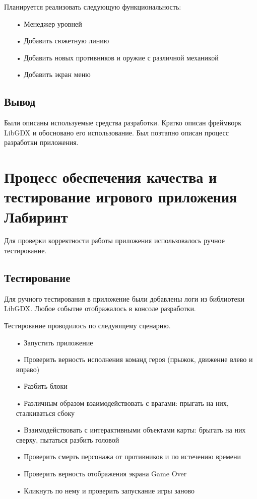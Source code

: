 Планируется реализовать следующую функциональность:
\begin{enumerate}
\item[•]  Менеджер уровней
\item[•]  Добавить сюжетную линию
\item[•]  Добавить новых противников и оружие с различной механикой
\item[•]  Добавить экран меню
\end{enumerate}

\subsection{Вывод}

Были описаны используемые средства разработки. Кратко описан фреймворк LibGDX и обосновано его использование. Был поэтапно описан процесс разработки приложения.

\section{Процесс обеспечения качества и тестирование игрового приложения Лабиринт}


Для проверки корректности работы приложения использовалось ручное тестирование.

\subsection{Тестирование}

Для ручного тестирования в приложение были добавлены логи из библиотеки LibGDX. Любое событие отображалось в консоле разработки.

Тестирование проводилось по следующему сценарию.
\begin{enumerate}
\item[•]  Запустить приложение
\item[•]  Проверить верность исполнения команд героя (прыжок, движение влево и вправо)
\item[•]  Разбить блоки
\item[•]  Различным образом взаимодействовать с врагами: прыгать на них, сталкиваться сбоку
\item[•]  Взаимодействовать с интерактивными объектами карты: брыгать на них сверху, пытаться разбить головой
\item[•]  Проверить смерть персонажа от противников и по истечению времени
\item[•]  Проверить верность отображения экрана Game Over
\item[•]  Кликнуть по нему и проверить запускание игры заново

\end{enumerate}



